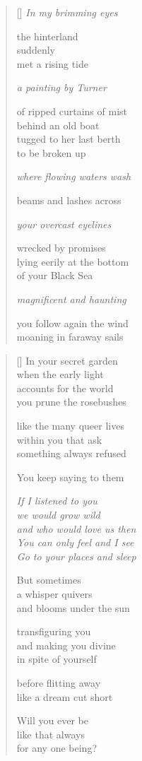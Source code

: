\documentclass[12pt,a4paper]{article}
\begin{document}
\begin{verse}[\versewidth]
\emph{In my brimming eyes}

the hinterland \\
suddenly \\
met a rising tide

\emph{a painting by Turner}

of ripped curtains of mist \\
behind an old boat \\
tugged to her last berth \\
to be broken up

\emph{where flowing waters wash}

beams and lashes across

\emph{your overcast eyelines}

wrecked by promises \\
lying eerily at the bottom \\
of your Black Sea

\emph{magnificent and haunting}

you follow again the wind \\
moaning in faraway sails
\end{verse}


\newpage

\poemtitle{}

\settowidth{\versewidth}{and who would love us then}

\bigskip

\begin{verse}[\versewidth]
  In your secret garden \\
  when the early light \\
  accounts for the world \\
  you prune the rosebushes

  like the many queer lives \\
  within you that ask \\
  something always refused

  You keep saying to them

  \emph{If I listened to you \\
  we would grow wild \\
  and who would love us then \\
  You can only feel and I see \\
  Go to your places and sleep}

  But sometimes \\
  a whisper quivers \\
  and blooms under the sun

  transfiguring you \\
  and making you divine \\
  in spite of yourself

  before flitting away \\
  like a dream cut short

  Will you ever be \\
  like that always \\
  for any one being?
\end{verse}
\end{document}
